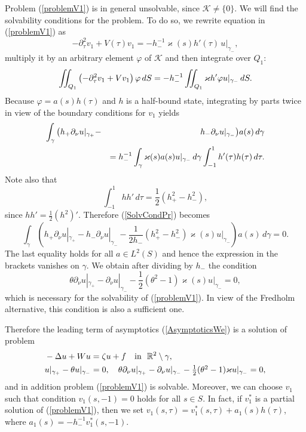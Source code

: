 \documentclass[graybox]{svmult}
\renewcommand{\kappa}{\varkappa}
\newcommand{\Real}{\mathbb R}
\renewcommand{\phi}{\varphi}
\newcommand{\eqref}[1]{(\ref{#1})}
\newcommand{\pte}{\partial_\tau}
\begin{document}
Problem \eqref{problemV1} is in general unsolvable, since $\mathcal{K}\neq\{0\}$. We will find the solvabi\-li\-ty conditions for the problem. To do so, we rewrite  equation in \eqref{problemV1} as
$$
  -\pte^2 v_1+V(\tau)v_1=- h_-^{-1}\kappa(s)h'(\tau)\,u|_{\gamma_-},
$$
multiply it by an arbitrary element $\phi$ of  $\mathcal{K}$  and then integrate over $Q_1$:
$$
\int\kern-6pt\int_{Q_1}\left(-\pte^2 v_1+Vv_1\right)\phi\,dS=
-h_-^{-1}\int\kern-6pt\int_{Q_1}\kappa h' \phi u|_{\gamma_-}\,dS.
$$
Because $\phi=a(s)h(\tau)$ and $h$ is a half-bound state, integrating by parts twice  in view of the boundary conditions for $v_1$ yields
\begin{eqnarray}\nonumber
\int_{\gamma}\big(h_+\partial_\nu u|_{\gamma_+}-&&\kern-4pt h_-\partial_\nu u|_{\gamma_-}\big) a(s)\,d\gamma\\\label{SolvCondPr}
&&=h_-^{-1} \int_{\gamma}\kappa(s)a(s)u|_{\gamma_-}\,d\gamma
\int_{-1}^1h'(\tau)h(\tau)\,d \tau.
\end{eqnarray}
Note also that
$$
  \int_{-1}^1hh'\,d \tau=\frac12 \left(h_+^2-h_-^2\right),
$$
since $hh'=\frac12 (h^2)'$. Therefore \eqref{SolvCondPr} becomes
$$
\int_{\gamma}\left(h_+\partial_\nu u|_{\gamma_+}-h_-\partial_\nu u|_{\gamma_-}
-\frac{1}{2 h_-}(h_+^2-h_-^2)\kappa(s)u|_{\gamma_-}\right)a(s)\,d\gamma= 0.
$$
The last equality holds for all $a\in L^2(S)$ and hence  the expression in the brackets vanishes on $\gamma$. We obtain after dividing by $h_-$ the  condition
\begin{equation}\label{RCond1}
  \theta\partial_\nu u|_{\gamma_+}-\partial_\nu u|_{\gamma_-}
-\textstyle\frac{1}{2 }(\theta^2-1) \kappa(s) u|_{\gamma_-}=0,
\end{equation}
which is necessary for the solvability of \eqref{problemV1}.
In view of the Fredholm alternative, this condition is also a sufficient one.

Therefore the leading term of asymptotics \eqref{AsymptoticsWe} is a solution of problem
\begin{eqnarray}\label{LimitProblemEq}
&-\Delta u+Wu=\zeta u+f \quad \hbox{in \ } \Real^2\setminus \gamma,\\\label{LimitProblemCnds}
 &u|_{\gamma_+}-\theta u|_{\gamma_-}=0,\quad  \theta\partial_\nu u|_{\gamma_+}-\partial_\nu u|_{\gamma_-}
-\textstyle\frac{1}{2 }(\theta^2-1) \kappa u|_{\gamma_-}=0,
\end{eqnarray}
and in addition problem \eqref{problemV1} is solvable. Moreover, we can choose $v_1$ such that condition $v_1(s,-1)=0$ holds for all $s\in S$.
In fact, if $v_1^*$ is a partial solution of \eqref{problemV1}, then we set $v_1(s,\tau)=v_1^*(s,\tau)+a_1(s)h(\tau)$,
where $a_1(s)=-h_-^{-1}v_1^*(s,-1)$.
\end{document}
